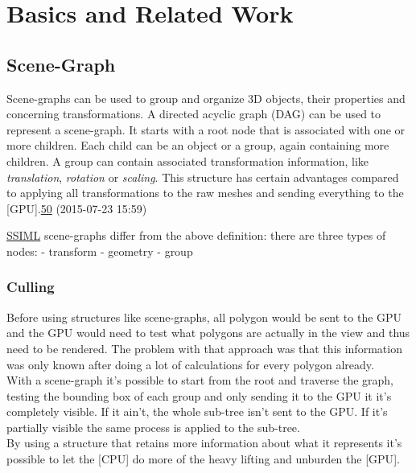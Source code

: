 
\section{Basics and Related Work}
\label{basics-and-related-work}

\subsection{Scene-Graph}\label{scene-graph}

Scene-graphs can be used to group and organize 3D objects, their
properties and concerning transformations. A directed acyclic graph
(DAG) can be used to represent a scene-graph. It starts with a root node
that is associated with one or more children. Each child can be an
object or a group, again containing more children. A group can contain
associated transformation information, like \emph{translation},
\emph{rotation} or \emph{scaling}. This structure has certain advantages
compared to applying all transformations to the raw meshes and sending
everything to the
{[}GPU{]}.\href{http://www.realityprime.com/blog/2007/06/scenegraphs-past-present-and-future/}{50}
(2015-07-23 15:59)

\hyperref[ssiml]{SSIML} scene-graphs differ from the above definition:
there are three types of nodes: - transform - geometry - group

\subsubsection{Culling}\label{culling}

Before using structures like scene-graphs, all polygon would be sent to
the GPU and the GPU would need to test what polygons are actually in the
view and thus need to be rendered. The problem with that approach was
that this information was only known after doing a lot of calculations
for every polygon already.\\
With a scene-graph it's possible to start from the root and traverse the
graph, testing the bounding box of each group and only sending it to the
GPU it it's completely visible. If it ain't, the whole sub-tree isn't
sent to the GPU. If it's partially visible the same process is applied
to the sub-tree.\\
By using a structure that retains more information about what it
represents it's possible to let the {[}CPU{]} do more of the heavy
lifting and unburden the {[}GPU{]}.

